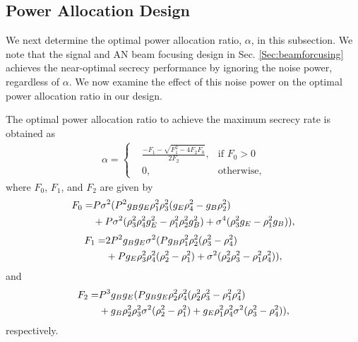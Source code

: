 \documentclass[10pt,technote]{IEEEtran}
\newcommand{\1}{\mathbbm{1}}
\begin{document}
\subsection{Power Allocation Design}

We next determine the optimal power allocation ratio, $\alpha$, in this subsection. We note that the signal and AN beam focusing design in Sec. \ref{Sec:beamforcusing} achieves the near-optimal secrecy performance by ignoring the noise power, regardless of $\alpha$. We now examine the effect of this noise power on the optimal power allocation ratio in our design.

\Lemma\label{Lemma:1} The optimal power allocation ratio to achieve the maximum secrecy rate is obtained as
\begin{align}
\alpha = \left\{
\begin{aligned}
&\frac{-F_1-\sqrt{F_1^2-4F_2F_0}}{2F_2},&\textrm{if } F_0>0 \\
&0, &\textrm{otherwise,}
\end{aligned}
\right.
\end{align} 
where $F_0$, $F_1$, and $F_2$ are given by
\begin{align}
F_0=&P\sigma^2(P^2g_Bg_E\rho_1^2\rho_3^2(g_E\rho_4^2-g_B\rho_2^2)\notag\\
&+P\sigma^2(\rho_3^2\rho_4^2g_E^2-\rho_1^2\rho_2^2g_B^2)+\sigma^4(\rho_3^2g_E-\rho_1^2g_B)),
\end{align}
\begin{align}
F_1=&2P^2g_Bg_E\sigma^2(Pg_B\rho_1^2\rho_2^2(\rho_3^2-\rho_4^2)\notag\\
&+Pg_E\rho_3^2\rho_4^2(\rho_2^2-\rho_1^2)+\sigma^2(\rho_2^2\rho_3^2-\rho_1^2\rho_4^2)),
\end{align}
and
\begin{align}
F_2=&P^3 g_B g_E (Pg_Bg_E\rho_2^2\rho_4^2(\rho_2^2\rho_3^2-\rho_1^2\rho_4^2) \notag\\
&+g_B\rho_2^2\rho_3^2\sigma^2(\rho_2^2-\rho_1^2)+g_E\rho_1^2\rho_4^2\sigma^2(\rho_3^2-\rho_4^2)),
\end{align}
respectively.
\end{document}
